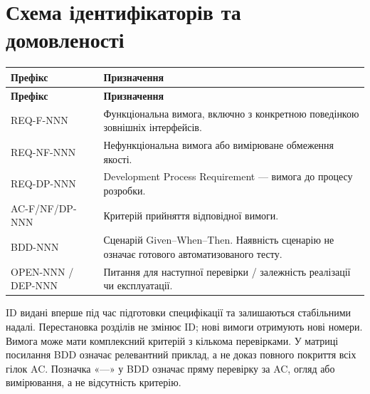 \documentclass[11pt,a4paper]{article}
\begin{document}
\section{Схема ідентифікаторів та домовленості}
\begin{longtable}{>{\raggedright\arraybackslash}p{4.4cm} >{\raggedright\arraybackslash}p{11.2cm}}
\toprule
\textbf{Префікс} & \textbf{Призначення} \\ \midrule
\endfirsthead
\toprule
\textbf{Префікс} & \textbf{Призначення} \\ \midrule
\endhead
\bottomrule
\endfoot
REQ-F-NNN & Функціональна вимога, включно з конкретною поведінкою зовнішніх інтерфейсів. \\
REQ-NF-NNN & Нефункціональна вимога або вимірюване обмеження якості. \\
REQ-DP-NNN & Development Process Requirement — вимога до процесу розробки. \\
AC-F/NF/DP-NNN & Критерій прийняття відповідної вимоги. \\
BDD-NNN & Сценарій Given–When–Then. Наявність сценарію не означає готового автоматизованого тесту. \\
OPEN-NNN / DEP-NNN & Питання для наступної перевірки / залежність реалізації чи експлуатації. \\
\end{longtable}

ID видані вперше під час підготовки специфікації та залишаються стабільними надалі. Перестановка розділів не змінює ID; нові вимоги отримують нові номери. Вимога може мати комплексний критерій з кількома перевірками. У матриці посилання BDD означає релевантний приклад, а не доказ повного покриття всіх гілок AC. Позначка «—» у BDD означає пряму перевірку за AC, огляд або вимірювання, а не відсутність критерію.
\end{document}
